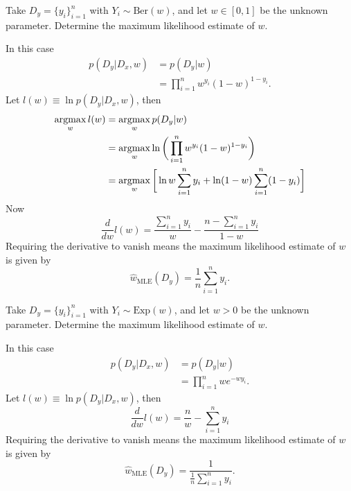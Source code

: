\begin{example}
	Take $D_y= \{y_i\}_{i=1}^n$ with $Y_i\sim \mathrm{Ber}(w)$, and let $w\in [0,1]$ be the unknown parameter. Determine the maximum likelihood estimate of $w$.\newline
	
	\noindent In this case
	\begin{equation}
		\begin{split}
			p(D_y|D_x,w) & =p(D_y|w)\\
			& = \prod_{i=1}^nw^{y_i}(1-w)^{1-y_i}.
		\end{split}
	\end{equation}
	Let $l(w)\equiv \ln p(D_y|D_x,w)$, then
	\begin{equation}
		\begin{split}
			\operatorname*{argmax}_wl(w) & = \operatorname*{argmax}_wp(D_y|w)\\
			&= \operatorname*{argmax}_w\ln \bigg(\prod_{i=1}^nw^{y_i}(1-w)^{1-y_i}\bigg)\\
			&=\operatorname*{argmax}_w \bigg[\ln w\sum_{i=1}^ny_i + \ln(1-w)\sum_{i=1}^n(1-y_i)\bigg]
		\end{split}
	\end{equation}
	Now 
	\begin{equation}
		\frac{d}{dw}l(w)=\frac{\sum_{i=1}^ny_i}{w}-\frac{n-\sum_{i=1}^ny_i}{1-w}
	\end{equation}
	Requiring the derivative to vanish means the maximum likelihood estimate of $w$ is given by
	\begin{equation}
		\hat{w}_{\text{MLE}}(D_y)=\frac{1}{n}\sum_{i=1}^ny_i.
	\end{equation}
\end{example}
\begin{example}
	Take $D_y= \{y_i\}_{i=1}^n$ with $Y_i\sim \mathrm{Exp}(w)$, and let $w> 0$ be the unknown parameter. Determine the maximum likelihood estimate of $w$.\newline
	
	\noindent In this case
	\begin{equation}
		\begin{split}
			p(D_y|D_x,w)& =p(D_y|w)\\
			& =\prod_{i=1}^nw e^{-w y_i}.
		\end{split}
	\end{equation}
	Let $l(w)\equiv \ln p(D_y|D_x,w)$, then
	\begin{equation}
		\frac{d}{dw}l(w)=\frac{n}{w}-\sum_{i=1}^ny_i
	\end{equation}
	Requiring the derivative to vanish means the maximum likelihood estimate of $w$ is given by
	\begin{equation}
		\hat{w}_{\text{MLE}}(D_y)=\frac{1}{\frac{1}{n}\sum_{i=1}^ny_i}.
	\end{equation}
\end{example}

